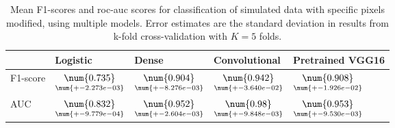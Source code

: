 \begin{table}
\centering
\caption{
Mean F1-scores and roc-auc scores for classification of simulated data with specific pixels
modified, using multiple models. Error estimates are the standard deviation in results from 
k-fold cross-validation with $K=5$ folds.
}
\label{tab:classification-simulated-pixelmod-f1-auc}
\begin{tabular}{lllll}
\toprule
{} &                                            Logistic &                                               Dense &                                       Convolutional &                                    Pretrained VGG16 \\
\midrule
F1-score &  $\underset{\num{+- 2.273e-03 }  }{\num{ 0.735 } }$ &  $\underset{\num{+- 8.276e-03 }  }{\num{ 0.904 } }$ &  $\underset{\num{+- 3.640e-02 }  }{\num{ 0.942 } }$ &  $\underset{\num{+- 1.926e-02 }  }{\num{ 0.908 } }$ \\
AUC      &  $\underset{\num{+- 9.779e-04 }  }{\num{ 0.832 } }$ &  $\underset{\num{+- 2.604e-03 }  }{\num{ 0.952 } }$ &  $\underset{\num{+- 9.848e-03 }  }{\num{ 0.98 } }$ &  $\underset{\num{+- 9.530e-03 }  }{\num{ 0.953 } }$ \\
\bottomrule
\end{tabular}
\end{table}
